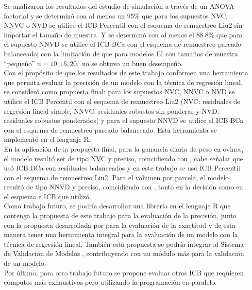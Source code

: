 Se analizaron los resultados del estudio de simulación a través de un ANOVA factorial y se determinó con al menos un 95\% que para los supuestos NVC, NNVC o NVD se utilice el ICB Percentil con el esquema de remuestreo Liu2 sin importar el tamaño de muestra. Y se determinó con al menos el 88.8\% que para el supuesto NNVD se utilice el ICB BCa con el esquema de remuestreo pareado balanceado; con la limitación de que para modelos EI con tamaños de muestra “pequeño” $n=10, 15, 20,$ no se obtuvo un buen desempeño.\\


Con el propósito de que los resultados de este trabajo conformen una herramienta que permita evaluar la precisión de un modelo con la técnica de regresión lineal, se consideró como propuesta final: para los supuestos NVC, NNVC o NVD se utilice el ICB Percentil con el esquema de remuestreo Liu2 (NVC: residuales de regresión lineal simple, NNVC: residuales robustos sin ponderar y NVD: residuales robustos ponderados) y para el supuesto NNVD se utilice el ICB BCa con el esquema de remuestreo pareado balanceado. Esta herramienta se implementó en el lenguaje R.\\

En la aplicación de la propuesta final, para la ganancia diaria de peso en ovinos, el modelo resultó ser de tipo NVC y preciso, coincidiendo con \textcite{balam-2012}, cabe señalar que usó ICB BCa con residuales balanceados y en este trabajo se usó ICB Percentil con el esquema de remuestreo Liu2. Para el volumen por parcela, el modelo resultó de tipo NNVD y preciso, coincidiendo con \textcite{balam-2012}, tanto en la decisión como en el esquema e ICB que utilizó.\\


Como trabajo futuro, se podría desarrollar una librería en el lenguaje R que contenga la propuesta de este trabajo para la evaluación de la precisión, junto con la propuesta desarrollada por \textcite{zacarias-2023} para la evaluación de la exactitud y de esta manera tener una herramienta integral para la evaluación de un modelo con la técnica de regresión lineal. También esta propuesta se podría integrar al Sistema de Validación de Modelos \parencite{mazun-2014}, contribuyendo con un módulo más para la validación de un modelo. \\


Por último, para otro trabajo futuro se propone evaluar otros ICB que requieren cómputos más exhaustivos pero utilizando la programación en paralelo.\\








